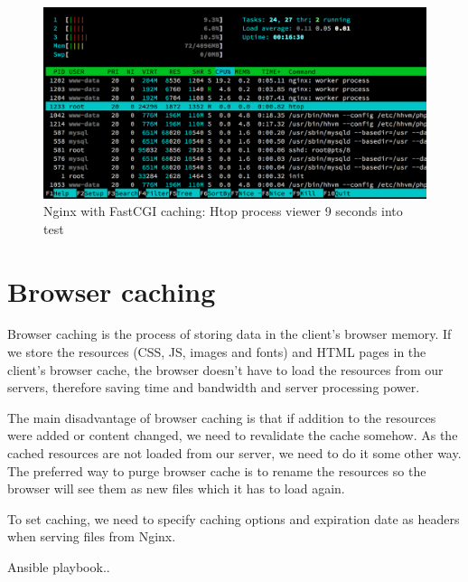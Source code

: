 \begin{figure}[H]
\begin{center}
\includegraphics[scale=0.5]{figures/Nginx_FastCGI_caching_9s.png}
\caption{Nginx with FastCGI caching: Htop process viewer 9 seconds into test}
\label{fig:nginx_fastcgi_caching}
\end{center}
\end{figure}

\section{Browser caching}

Browser caching is the process of storing data in the client's browser memory. If we store the resources (CSS, JS, images and fonts) and HTML pages in the client's browser cache, the browser doesn't have to load the resources from our servers, therefore saving time and bandwidth and server processing power.

The main disadvantage of browser caching is that if addition to the resources were added or content changed, we need to revalidate the cache somehow. As the cached resources are not loaded from our server, we need to do it some other way. The preferred way to purge browser cache is to rename the resources so the browser will see them as new files which it has to load again.

To set caching, we need to specify caching options and expiration date as headers when serving files from Nginx. 

Ansible playbook..
